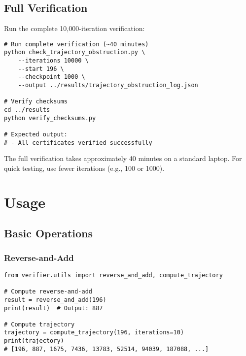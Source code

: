 \documentclass[11pt,a4paper]{article}
\begin{document}
\subsection{Full Verification}

Run the complete 10,000-iteration verification:

\begin{lstlisting}[style=bashstyle, caption={Full Verification (10,000 iterations)}]
# Run complete verification (~40 minutes)
python check_trajectory_obstruction.py \
    --iterations 10000 \
    --start 196 \
    --checkpoint 1000 \
    --output ../results/trajectory_obstruction_log.json

# Verify checksums
cd ../results
python verify_checksums.py

# Expected output:
# - All certificates verified successfully
\end{lstlisting}

\begin{warningbox}
The full verification takes approximately 40 minutes on a standard laptop. For quick testing, use fewer iterations (e.g., 100 or 1000).
\end{warningbox}

\section{Usage}

\subsection{Basic Operations}

\subsubsection{Reverse-and-Add}

\begin{lstlisting}[style=pythonstyle, caption={Basic Reverse-and-Add}]
from verifier.utils import reverse_and_add, compute_trajectory

# Compute reverse-and-add
result = reverse_and_add(196)
print(result)  # Output: 887

# Compute trajectory
trajectory = compute_trajectory(196, iterations=10)
print(trajectory)
# [196, 887, 1675, 7436, 13783, 52514, 94039, 187088, ...]
\end{lstlisting}
\end{document}
